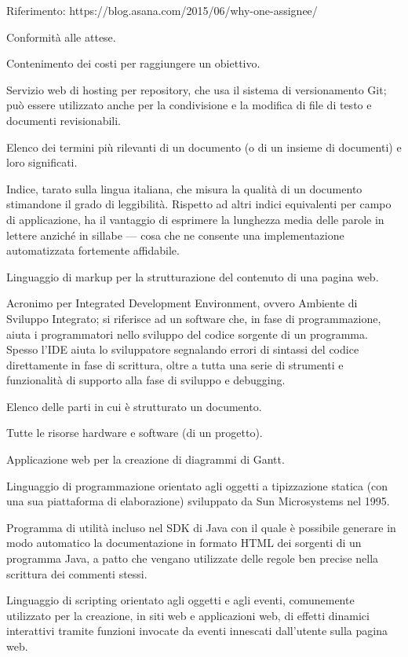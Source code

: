 Riferimento: https://blog.asana.com/2015/06/why-one-assignee/ 
\item[efficacia] Conformità alle attese.
\item[efficienza] Contenimento dei costi per raggiungere un obiettivo.
\item[GitHub] Servizio web di hosting per repository, che usa il sistema di versionamento Git; può essere utilizzato anche per la condivisione e la modifica di file di testo e documenti revisionabili.
\item[glossario] Elenco dei termini più rilevanti di un documento (o di un insieme di documenti) e loro significati.
\item[Gulpease, indice di] Indice, tarato sulla lingua italiana, che misura la qualità di un documento stimandone il grado di leggibilità. Rispetto ad altri indici equivalenti per campo di applicazione, ha il vantaggio di esprimere la lunghezza media delle parole in lettere anziché in sillabe --- cosa che ne consente una implementazione automatizzata fortemente affidabile. 
\item[HTML5] Linguaggio di markup per la strutturazione del contenuto di una pagina web.
\item[IDE]  Acronimo per Integrated Development Environment, ovvero Ambiente di Sviluppo Integrato; si riferisce ad un software che, in fase di programmazione, aiuta i programmatori nello sviluppo del codice sorgente di un programma. Spesso l'IDE aiuta lo sviluppatore segnalando errori di sintassi del codice direttamente in fase di scrittura, oltre a tutta una serie di strumenti e funzionalità di supporto alla fase di sviluppo e debugging.
\item[indice generale] Elenco delle parti in cui è strutturato un documento.
\item[infrastruttura] Tutte le risorse hardware e software (di un progetto).
\item[Instagantt] Applicazione web per la creazione di diagrammi di Gantt.
\item[Java] Linguaggio di programmazione orientato agli oggetti a tipizzazione statica (con una sua piattaforma di elaborazione) sviluppato da Sun Microsystems nel 1995.
\item[Javadoc] Programma di utilità incluso nel SDK di Java con il quale è possibile generare in modo automatico la documentazione in formato HTML dei sorgenti di un programma Java, a patto che vengano utilizzate delle regole ben precise nella scrittura dei commenti stessi.
\item[JavaScript] Linguaggio di scripting orientato agli oggetti e agli eventi, comunemente utilizzato per la creazione, in siti web e applicazioni web, di effetti dinamici interattivi tramite funzioni invocate da eventi innescati dall’utente sulla pagina web.
